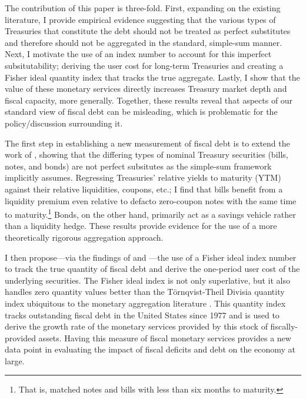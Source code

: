 \documentclass[11pt,a4paper,margin=1.5in]{article}
\begin{document}
The contribution of this paper is three-fold.
First, expanding on the existing literature, I provide empirical evidence suggesting that the various types of Treasuries that constitute the debt should not be treated as perfect substitutes and therefore should not be aggregated in the standard, simple-sum manner. 
Next, I motivate the use of an index number to account for this imperfect subsitutability; deriving the user cost for long-term Treasuries and creating a Fisher ideal quantity index that tracks the true aggregate.
Lastly, I show that the value of these monetary services directly increases Treasury market depth and fiscal capacity, more generally.
Together, these results reveal that aspects of our standard view of fiscal debt can be misleading, which is problematic for the policy/discussion surrounding it.

The first step in establishing a new measurement of fiscal debt is to extend the work of \citet{Amihud-Mendelson:1991}, showing that the differing types of nominal Treasury securities (bills, notes, and bonds) are not perfect subsitutes as the simple-sum framework implicitly assumes. 
Regressing Treasuries' relative yields to maturity (YTM) against their relative liquidities, coupons, etc.; I find that bills benefit from a liquidity premium even relative to defacto zero-coupon notes with the same time to maturity.\footnote{
	That is, matched notes and bills with less than six months to maturity.
}
Bonds, on the other hand, primarily act as a savings vehicle rather than a liquidity hedge. 
These results provide evidence for the use of a more theoretically rigorous aggregation approach.


I then propose---via the findings of \citet{Diewert:1976,Diewert:1978} and \citet{Dumagan:2002}---the use of a Fisher ideal index number to track the true quantity of fiscal debt and derive the one-period user cost of the underlying securities.
The Fisher ideal index is not only superlative, but it also handles zero quantity values better than the T\"{o}rnqvist-Theil Divisia quantity index ubiquitous to the monetary aggregation literature \citep[e.g.][]{Barnett-Serletis:2000}.
This quantity index tracks outstanding fiscal debt in the United States since 1977 and is used to derive the growth rate of the monetary services provided by this stock of fiscally-provided assets. 
Having this measure of fiscal monetary services provides a new data point in evaluating the impact of fiscal deficits and debt on the economy at large. 
\end{document}
